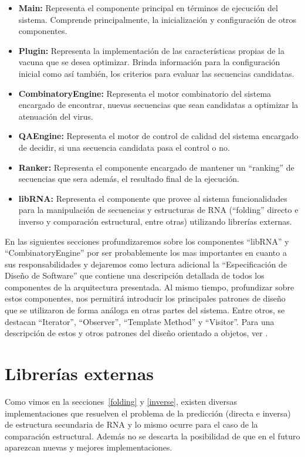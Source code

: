 \begin{itemize}
   \item \textbf{Main:} Representa el componente principal en t\'erminos de
ejecuci\'on del sistema. Comprende principalmente, la inicializaci\'on y
configuraci\'on de otros componentes.
   \item \textbf{Plugin:} Representa la implementaci\'on de las
caracter\'isticas propias de la vacuna que se desea optimizar. Brinda
informaci\'on para la configuraci\'on inicial como as\'i tambi\'en, los
criterios para evaluar las secuencias candidatas.
   \item \textbf{CombinatoryEngine:} Representa el motor combinatorio del
sistema encargado de encontrar, nuevas secuencias que sean candidatas a
optimizar la atenuaci\'on del virus.
   \item \textbf{QAEngine:} Representa el motor de control de calidad del
sistema encargado de decidir, si una secuencia candidata pasa el control o no.
   \item \textbf{Ranker:} Representa el componente encargado de mantener un
``ranking'' de secuencias que sera adem\'as, el resultado final de la
ejecuci\'on.
   \item \textbf{libRNA:} Representa el componente que provee al sistema
funcionalidades para la manipulaci\'on de secuencias y estructuras de \ac{RNA}
(``folding'' directo e inverso y comparaci\'on estructural, entre otras)
utilizando librer\'ias externas.
  \end{itemize}

En las siguientes secciones profundizaremos sobre los componentes ``libRNA'' y
``CombinatoryEngine'' por ser probablemente los mas importantes en cuanto a sus
responsabilidades y dejaremos como lectura adicional la ``Especificaci\'on de
Dise\~no de Software'' que contiene una descripci\'on detallada de todos los
componentes de la arquitectura presentada. Al mismo tiempo, profundizar sobre
estos componentes, nos permitir\'a introducir los principales patrones de
dise\~no que se utilizaron de forma an\'aloga en otras partes del sistema.
Entre otros, se destacan ``Iterator'', ``Observer'', ``Template Method'' y
``Visitor''. Para una descripci\'on de estos y otros patrones del dise\~no
orientado a objetos, ver \cite{Gamma95}.

\section{Librer\'ias externas}

Como vimos en la secciones~\ref{folding} y \ref{inverse}, existen diversas
implementaciones que resuelven el problema de la predicci\'on (directa e
inversa) de estructura secundaria de \ac{RNA} y lo mismo ocurre para el caso de
la comparaci\'on estructural. Adem\'as no se descarta la posibilidad de que en
el futuro aparezcan nuevas y mejores implementaciones. 

